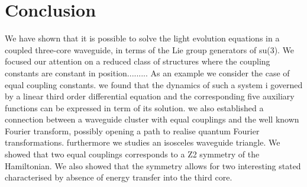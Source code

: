 \documentclass[9pt,twocolumn,twoside]{osajnl}
\begin{document}
\section{Conclusion}
We have shown that it is possible to solve the light evolution
equations in a coupled three-core waveguide, in terms of
the Lie group generators of su(3). We focused our attention on a
reduced class of structures where the coupling constants
are constant in position......... As an
example we consider the case of equal coupling constants.
we found that the dynamics of such a system i 
governed by a linear third order differential equation and the
corresponding five auxiliary functions can be expressed in term of its solution.
we also established a connection between a waveguide cluster
with equal couplings and the well known Fourier transform, possibly opening
a path to realise quantum Fourier transformations.
furthermore we studies an isosceles waveguide triangle.
We showed that two equal couplings corresponds to
a Z2 symmetry of the Hamiltonian. We also showed 
that the symmetry allows for two interesting stated
characterised by absence of energy transfer into the 
third core.









\end{document}

